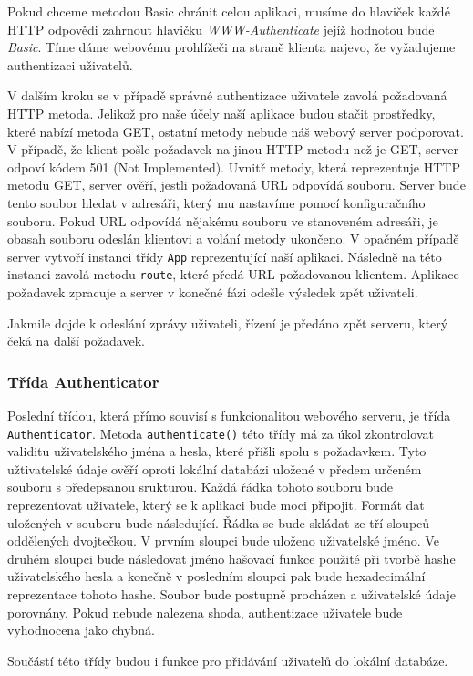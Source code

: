     Pokud chceme metodou Basic chránit celou aplikaci, musíme do hlaviček každé HTTP odpovědi zahrnout hlavičku \emph{WWW-Authenticate} jejíž hodnotou bude \emph{Basic}. Tíme dáme webovému prohlížeči na straně klienta najevo, že vyžadujeme authentizaci uživatelů.

    V dalším kroku se v případě správné authentizace uživatele zavolá požadovaná HTTP metoda. Jelikož pro naše účely naší aplikace budou stačit prostředky, které nabízí metoda GET, ostatní metody nebude náš webový server podporovat. V případě, že klient pošle požadavek na jinou HTTP metodu než je GET, server odpoví kódem 501 (Not Implemented). Uvnitř metody, která reprezentuje HTTP metodu GET, server ověří, jestli požadovaná URL odpovídá souboru. Server bude tento soubor hledat v adresáři, který mu nastavíme pomocí konfiguračního souboru. Pokud URL odpovídá nějakému souboru ve stanoveném adresáři, je obasah souboru odeslán klientovi a volání metody ukončeno. V opačném případě server vytvoří instanci třídy \verb|App| reprezentující naší aplikaci. Následně na této instanci zavolá metodu \verb|route|, které předá URL požadovanou klientem. Aplikace požadavek zpracuje a server v konečné fázi odešle výsledek zpět uživateli.

    Jakmile dojde k odeslání zprávy uživateli, řízení je předáno zpět serveru, který čeká na další požadavek.
    \subsubsection{Třída Authenticator}
    Poslední třídou, která přímo souvisí s funkcionalitou webového serveru, je třída \verb|Authenticator|. Metoda \verb|authenticate()| této třídy má za úkol zkontrolovat validitu uživatelského jména a hesla, které přišli spolu s požadavkem. Tyto užtivatelské údaje ověří oproti lokální databázi uložené v předem určeném souboru s předepsanou srukturou. Každá řádka tohoto souboru bude reprezentovat uživatele, který se k aplikaci bude moci připojit. Formát dat uložených v souboru bude následující. Řádka se bude skládat ze tří sloupců oddělených dvojtečkou. V prvním sloupci bude uloženo uživatelské jméno. Ve druhém sloupci bude následovat jméno hašovací funkce použité při tvorbě hashe uživatelského hesla a konečně v posledním sloupci pak bude hexadecimální reprezentace tohoto hashe. Soubor bude postupně procházen a uživatelské údaje porovnány. Pokud nebude nalezena shoda, authentizace uživatele bude vyhodnocena jako chybná.

    Součástí této třídy budou i funkce pro přidávání uživatelů do lokální databáze.
